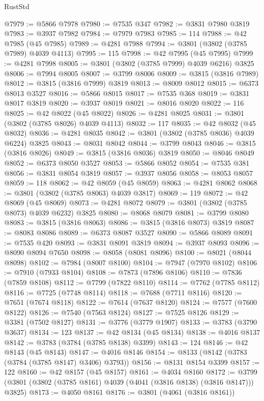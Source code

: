 \begin{lexlean}{RustStd}
\begin{coremodule}
@7979 := @5866 @7978
@7980 := @7535 @347
@7982 := @3831 @7980 @3819
@7983 := @3937 @7982
@7984 := @7979 @7983
@7985 := 114
@7988 := @42 @7985 (@45 @7985)
@7989 := @4281 @7988
@7994 := @3801 (@3802 (@3785 @7989) @4039 @4113)
@7995 := 115
@7998 := @42 @7995 (@45 @7995)
@7999 := @4281 @7998
@8005 := @3801 (@3802 (@3785 @7999) @4039 @6216) @3825
@8006 := @7994 @8005
@8007 := @3799 @8006
@8009 := @3815 (@3816 @7989)
@8012 := @3815 (@3816 @7999) @3819
@8013 := @8009 @8012
@8015 := @6373 @8013 @3527
@8016 := @5866 @8015
@8017 := @7535 @368
@8019 := @3831 @8017 @3819
@8020 := @3937 @8019
@8021 := @8016 @8020
@8022 := 116
@8025 := @42 @8022 (@45 @8022)
@8026 := @4281 @8025
@8031 := @3801 (@3802 (@3785 @8026) @4039 @4113)
@8032 := 117
@8035 := @42 @8032 (@45 @8032)
@8036 := @4281 @8035
@8042 := @3801 (@3802 (@3785 @8036) @4039 @6224) @3825
@8043 := @8031 @8042
@8044 := @3799 @8043
@8046 := @3815 (@3816 @8026)
@8049 := @3815 (@3816 @8036) @3819
@8050 := @8046 @8049
@8052 := @6373 @8050 @3527
@8053 := @5866 @8052
@8054 := @7535 @381
@8056 := @3831 @8054 @3819
@8057 := @3937 @8056
@8058 := @8053 @8057
@8059 := 118
@8062 := @42 @8059 (@45 @8059)
@8063 := @4281 @8062
@8068 := @3801 (@3802 (@3785 @8063) @4039 @3817)
@8069 := 119
@8072 := @42 @8069 (@45 @8069)
@8073 := @4281 @8072
@8079 := @3801 (@3802 (@3785 @8073) @4039 @6232) @3825
@8080 := @8068 @8079
@8081 := @3799 @8080
@8083 := @3815 (@3816 @8063)
@8086 := @3815 (@3816 @8073) @3819
@8087 := @8083 @8086
@8089 := @6373 @8087 @3527
@8090 := @5866 @8089
@8091 := @7535 @420
@8093 := @3831 @8091 @3819
@8094 := @3937 @8093
@8096 := @8090 @8094 @7650
@8098 := @8058 (@8081 @8096)
@8100 := @8021 (@8044 @8098)
@8102 := @7984 (@8007 @8100)
@8104 := @7947 (@7970 @8102)
@8106 := @7910 (@7933 @8104)
@8108 := @7873 (@7896 @8106)
@8110 := @7836 (@7859 @8108)
@8112 := @7799 (@7822 @8110)
@8114 := @7762 (@7785 @8112)
@8116 := @7725 (@7748 @8114)
@8118 := @7688 (@7711 @8116)
@8120 := @7651 (@7674 @8118)
@8122 := @7614 (@7637 @8120)
@8124 := @7577 (@7600 @8122)
@8126 := @7540 (@7563 @8124)
@8127 := @7525 @8126
@8129 := @3381 (@7502 @8127)
@8131 := @3776 (@3779 @1907)
@8133 := @3783 (@3790 @3637)
@8134 := 123
@8137 := @42 @8134 (@45 @8134)
@8138 := @4016 @8137
@8142 := @3783 (@3784 (@3785 @8138) @3399)
@8143 := 124
@8146 := @42 @8143 (@45 @8143)
@8147 := @4016 @8146
@8154 := @8133 (@8142 (@3783 (@3784 (@3785 @8147) @3406) @3793))
@8156 := @8131 @8154 @3399
@8157 := 122
@8160 := @42 @8157 (@45 @8157)
@8161 := @4034 @8160
@8172 := @3799 (@3801 (@3802 (@3785 @8161) @4039 (@4041 (@3816 @8138) (@3816 @8147))) @3825)
@8173 := @4050 @8161
@8176 := @3801 (@4061 (@3816 @8161))

\end{coremodule}
\end{lexlean}
